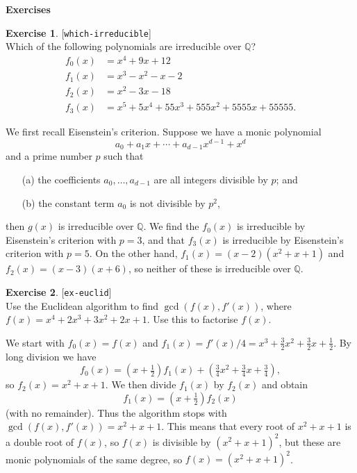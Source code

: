 \documentclass{amsart}
\newcommand{\Q}         {{\mathbb{Q}}}
\renewcommand{\:}{\colon}
\newcommand{\lastexlabel}{}
\newcommand{\exlabel}[1]{
 \global\def\lastexlabel{#1}\label{#1}[\texttt{#1}]\ \\
}
\newcommand{\exlabel}[1]{
 \global\def\lastexlabel{#1}\label{#1}
}
\newenvironment{solution}{\SolutionInline}{\endSolutionInline}
\theoremstyle{definition}
\newtheorem{exercise}{Exercise}[section]
\renewenvironment{solution}{\SolutionAtEnd}{\endSolutionAtEnd}
\begin{document}
\begin{center}
 \Large \textbf{Exercises}
\end{center}

\begin{exercise}\exlabel{which-irreducible}
 Which of the following polynomials are irreducible over $\Q$?
 \begin{align*}
  f_0(x) &= x^4 + 9x + 12 \\
  f_1(x) &= x^3-x^2-x-2 \\
  f_2(x) &= x^2-3x-18 \\
  f_3(x) &= x^5 + 5x^4 + 55x^3 + 555x^2 + 5555x + 55555.
 \end{align*}
\end{exercise}
\begin{solution}
 We first recall Eisenstein's criterion. Suppose we have a monic
 polynomial  
 \[ a_0 + a_1x + \dotsb + a_{d-1}x^{d-1} + x^d \]
 and a prime number $p$ such that
 \begin{itemize}
  \item[(a)] the coefficients $a_0,\dotsc,a_{d-1}$ are all integers
   divisible by $p$; and
  \item[(b)] the constant term $a_0$ is not divisible by $p^2$,
 \end{itemize}
 then $g(x)$ is irreducible over $\Q$.  We find the $f_0(x)$ is
 irreducible by Eisenstein's criterion with $p=3$, and that $f_3(x)$
 is irreducible by Eisenstein's criterion with $p=5$.  On the other
 hand, $f_1(x)=(x-2)(x^2+x+1)$ and $f_2(x)=(x-3)(x+6)$, so neither of
 these is irreducible over $\Q$.
\end{solution}
\begin{exercise}\exlabel{ex-euclid}
 Use the Euclidean algorithm to find $\gcd(f(x),f'(x))$, where
 $f(x)=x^4+2x^3+3x^2+2x+1$.  Use this to factorise $f(x)$. 
\end{exercise}
\begin{solution}
 We start with $f_0(x)=f(x)$ and
 $f_1(x)=f'(x)/4=x^3+\tfrac{3}{2}x^2+\tfrac{3}{2}x+\tfrac{1}{2}$.  By
 long division we have
 \[ f_0(x) = (x+\tfrac{1}{2})f_1(x) +
      (\tfrac{3}{4}x^2+\tfrac{3}{4}x+\tfrac{3}{4}),
 \]
 so $f_2(x)=x^2+x+1$.  We then divide $f_1(x)$ by $f_2(x)$ and obtain 
 \[ f_1(x) = (x+\tfrac{1}{2}) f_2(x) \]
 (with no remainder).  Thus the algorithm stops with
 $\gcd(f(x),f'(x))=x^2+x+1$.  This means that every root of $x^2+x+1$
 is a double root of $f(x)$, so $f(x)$ is divisible by $(x^2+x+1)^2$,
 but these are monic polynomials of the same degree, so
 $f(x)=(x^2+x+1)^2$.  
\end{solution}
\end{document}
